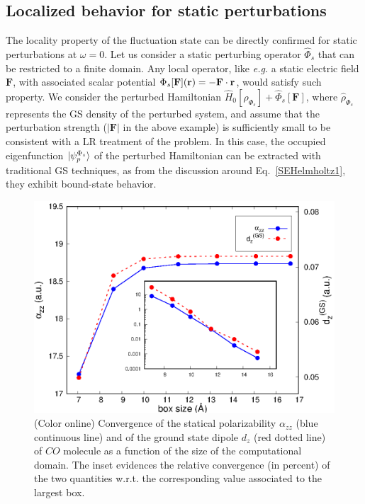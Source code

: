 \documentclass[reprint,aps,prb]{revtex4-1}
\renewcommand{\r}{{\bf r}}
\newcommand{\op}[1]{\hat {#1}}
\newcommand{\dm}{\op{\rho}}
\newcommand{\hnot}{\op{H}_0}
\begin{document}

\subsection{Localized behavior for static perturbations}


The locality property of the fluctuation state can be directly confirmed for static perturbations at $\omega=0$.
Let us consider a static perturbing operator $\op\Phi_s$ that can be restricted to a finite domain.
Any local operator, like \emph{e.g.} a static electric field $\mathbf F$, with associated scalar potential $\Phi_s[\mathbf F](\r) = -\mathbf F \cdot \r$, would satisfy such property.
We consider the perturbed Hamiltonian $\hnot[\dm_{\Phi_s}] + \op\Phi_s[\mathbf F]$, where $\dm_{\Phi_s}$ represents the GS density of the perturbed system, and assume that the
perturbation strength ($|\mathbf F|$ in the above example) is sufficiently small to be consistent with a LR treatment of the problem.
In this case, the occupied eigenfunction $\ket{\psi_p^{\Phi_s}}$ of the perturbed Hamiltonian can be extracted with traditional GS techniques,
as from the discussion around Eq.~\eqref{SEHelmholtz1}, they exhibit bound-state behavior.
\begin{figure}[t]
\includegraphics[scale=0.68]{Fig1_CO_statPolvsBox.eps}
\caption{\label{co_alphaStatic}(Color online) Convergence of the statical polarizability $\alpha_{zz}$ (blue continuous line) and of the ground state dipole $d_z$ (red dotted line)
of $CO$ molecule as a function of the size of the computational domain. The inset evidences the relative convergence (in percent) of the two quantities w.r.t. the corresponding value associated to the largest
box.}
\end{figure}
\end{document}
